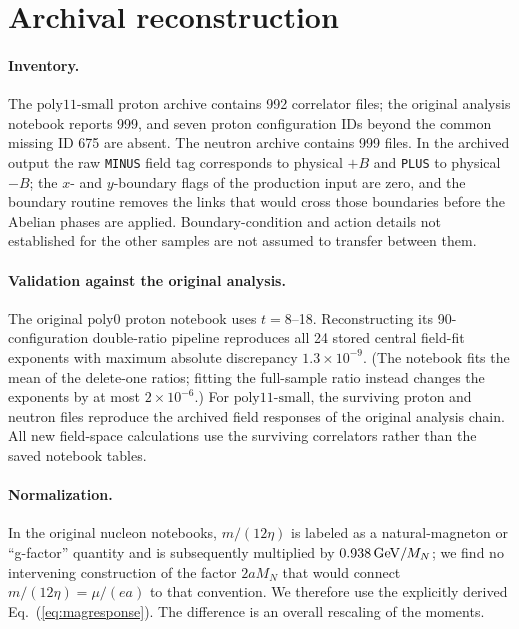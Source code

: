 \documentclass[aps,prd,preprint,nofootinbib,floatfix]{revtex4-2}
\begin{document}
\appendix

\section{Archival reconstruction}
\label{app:archive}

\paragraph{Inventory.} The $\mathrm{poly11\mbox{-}small}$ proton archive contains 992 correlator files; the original analysis notebook reports 999, and seven proton configuration IDs beyond the common missing ID 675 are absent. The neutron archive contains 999 files. In the archived output the raw \texttt{MINUS} field tag corresponds to physical $+B$ and \texttt{PLUS} to physical $-B$; the $x$- and $y$-boundary flags of the production input are zero, and the boundary routine removes the links that would cross those boundaries before the Abelian phases are applied. Boundary-condition and action details not established for the other samples are not assumed to transfer between them.

\paragraph{Validation against the original analysis.} The original $\mathrm{poly0}$ proton notebook uses $t=8$--18. Reconstructing its 90-configuration double-ratio pipeline reproduces all 24 stored central field-fit exponents with maximum absolute discrepancy $1.3\times10^{-9}$. (The notebook fits the mean of the delete-one ratios; fitting the full-sample ratio instead changes the exponents by at most $2\times10^{-6}$.) For $\mathrm{poly11\mbox{-}small}$, the surviving proton and neutron files reproduce the archived field responses of the original analysis chain. All new field-space calculations use the surviving correlators rather than the saved notebook tables.

\paragraph{Normalization.} In the original nucleon notebooks, $m/(12\eta)$ is labeled as a natural-magneton or ``g-factor'' quantity and is subsequently multiplied by $0.938\,{\rm GeV}/M_N$; we find no intervening construction of the factor $2aM_N$ that would connect $m/(12\eta)=\mu/(ea)$ to that convention. We therefore use the explicitly derived Eq.~(\ref{eq:magresponse}). The difference is an overall rescaling of the moments.
\end{document}
